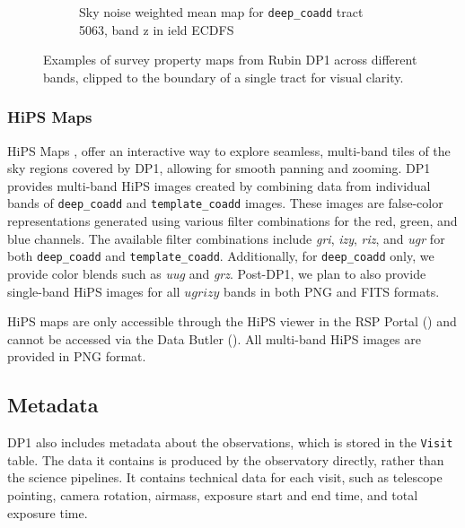 \begin{figure}[hbt!]
\begin{subfigure}[t]{0.31\textwidth}
  \caption{Sky noise weighted mean map for \texttt{deep\_coadd} \gls{tract} 5063, band z in ield ECDFS}
  \end{subfigure}\hfill
\caption{Examples of survey property maps from Rubin \gls{DP1} across different bands, clipped to the boundary of a single \gls{tract} for visual clarity.}
  \label{fig:survey_property_maps}
\end{figure}

\subsubsection{HiPS Maps}
\gls{HiPS} Maps \citep{2015A&A...578A.114F}, offer an interactive way to explore seamless, multi-band tiles of the sky regions covered by \gls{DP1}, allowing for smooth panning and zooming.
\gls{DP1} provides multi-band \gls{HiPS} images created by combining data from individual bands of \texttt{deep\_coadd} and \texttt{template\_coadd} images.
These images are false-color representations generated using various filter combinations for the red, green, and blue channels.
The available filter combinations include \textit{gri}, \textit{izy}, \textit{riz}, and \textit{ugr} for both \texttt{deep\_coadd} and \texttt{template\_coadd}.
Additionally, for \texttt{deep\_coadd} only, we provide color blends such as \textit{uug} and \textit{grz}.
Post-\gls{DP1}, we plan to also provide single-band HiPS images for all $ugrizy$ bands in both \gls{PNG} and \gls{FITS} formats.

\gls{HiPS} maps are only accessible through the \gls{HiPS} viewer in the \gls{RSP} Portal () and cannot be accessed via the Data \gls{Butler} ().
All multi-band \gls{HiPS} images are provided in \gls{PNG} format.

\subsection{Metadata
\label{ssec:metadata}}

\gls{DP1} also includes \gls{metadata} about the observations, which is stored in the \texttt{Visit} table. The data it contains is produced by the observatory directly, rather than the science pipelines.
It contains technical data for each visit, such as telescope pointing, \gls{camera} rotation, \gls{airmass}, exposure start and end time, and total exposure time.

